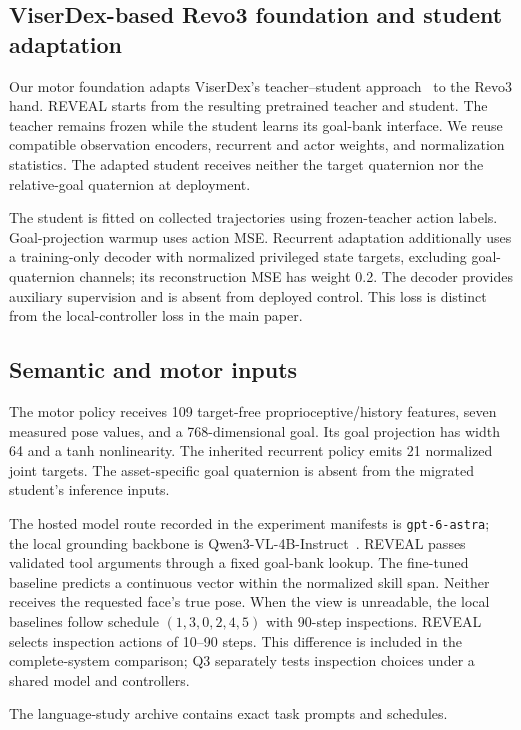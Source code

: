 \subsection{ViserDex-based Revo3 foundation and student adaptation}
Our motor foundation adapts ViserDex's teacher--student approach~\cite{bhardwaj2026viserdex} to the Revo3 hand. REVEAL starts from the resulting pretrained teacher and student. The teacher remains frozen while the student learns its goal-bank interface. We reuse compatible observation encoders, recurrent and actor weights, and normalization statistics. The adapted student receives neither the target quaternion nor the relative-goal quaternion at deployment.

The student is fitted on collected trajectories using frozen-teacher action labels. Goal-projection warmup uses action MSE. Recurrent adaptation additionally uses a training-only decoder with normalized privileged state targets, excluding goal-quaternion channels; its reconstruction MSE has weight 0.2. The decoder provides auxiliary supervision and is absent from deployed control. This loss is distinct from the local-controller loss in the main paper.

\subsection{Semantic and motor inputs}
The motor policy receives 109 target-free proprioceptive/history features, seven measured pose values, and a 768-dimensional goal. Its goal projection has width 64 and a tanh nonlinearity. The inherited recurrent policy emits 21 normalized joint targets. The asset-specific goal quaternion is absent from the migrated student's inference inputs.

The hosted model route recorded in the experiment manifests is \texttt{gpt-6-astra}; the local grounding backbone is Qwen3-VL-4B-Instruct~\cite{qwen3vl}. REVEAL passes validated tool arguments through a fixed goal-bank lookup. The fine-tuned baseline predicts a continuous vector within the normalized skill span. Neither receives the requested face's true pose. When the view is unreadable, the local baselines follow schedule $(1,3,0,2,4,5)$ with 90-step inspections. REVEAL selects inspection actions of 10--90 steps. This difference is included in the complete-system comparison; Q3 separately tests inspection choices under a shared model and controllers.

The language-study archive contains exact task prompts and schedules. 

